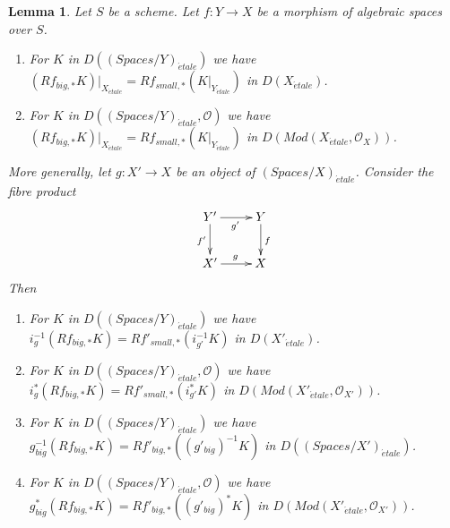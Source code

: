 \documentclass{stacks-project}
\theoremstyle{plain}
\newtheorem{lemma}[subsection]{Lemma}
\theoremstyle{definition}
\theoremstyle{remark}
\numberwithin{equation}{subsection}
\def\etale{{\acute{e}tale}}
\begin{document}
\begin{lemma}
\label{lemma-compare-higher-direct-image}
Let $S$ be a scheme.
Let $f : Y \to X$ be a morphism of algebraic spaces over $S$.
\begin{enumerate}
\item For $K$ in $D((\textit{Spaces}/Y)_\etale)$ we have
$
(Rf_{big, *}K)|_{X_\etale} = Rf_{small, *}(K|_{Y_\etale})
$
in $D(X_\etale)$.
\item For $K$ in $D((\textit{Spaces}/Y)_\etale, \mathcal{O})$ we have
$
(Rf_{big, *}K)|_{X_\etale} = Rf_{small, *}(K|_{Y_\etale})
$
in $D(\textit{Mod}(X_\etale, \mathcal{O}_X))$.
\end{enumerate}
More generally, let $g : X' \to X$ be an object of
$(\textit{Spaces}/X)_\etale$. Consider the fibre product
$$
\xymatrix{
Y' \ar[r]_{g'} \ar[d]_{f'} & Y \ar[d]^f \\
X' \ar[r]^g & X
}
$$
Then
\begin{enumerate}
\item[(3)] For $K$ in $D((\textit{Spaces}/Y)_\etale)$ we have
$i_g^{-1}(Rf_{big, *}K) = Rf'_{small, *}(i_{g'}^{-1}K)$
in $D(X'_\etale)$.
\item[(4)] For $K$ in $D((\textit{Spaces}/Y)_\etale, \mathcal{O})$ we have
$i_g^*(Rf_{big, *}K) = Rf'_{small, *}(i_{g'}^*K)$
in $D(\textit{Mod}(X'_\etale, \mathcal{O}_{X'}))$.
\item[(5)] For $K$ in $D((\textit{Spaces}/Y)_\etale)$ we have
$g_{big}^{-1}(Rf_{big, *}K) = Rf'_{big, *}((g'_{big})^{-1}K)$
in $D((\textit{Spaces}/X')_\etale)$.
\item[(6)] For $K$ in $D((\textit{Spaces}/Y)_\etale, \mathcal{O})$ we have
$g_{big}^*(Rf_{big, *}K) = Rf'_{big, *}((g'_{big})^*K)$
in $D(\textit{Mod}(X'_\etale, \mathcal{O}_{X'}))$.
\end{enumerate}
\end{lemma}
\end{document}
